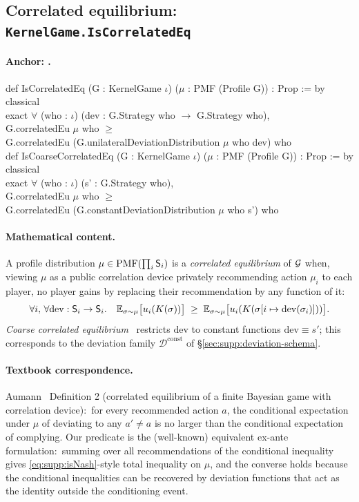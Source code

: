 \documentclass[11pt]{article}
\renewcommand{\TT}[1]{\texttt{\detokenize{#1}}}
\newcommand{\Anchor}[1]{\paragraph{Anchor: \texorpdfstring{\TT{#1}}{#1}.}}
\newcommand{\Mathematical}{\paragraph{Mathematical content.}}
\newcommand{\Textbook}{\paragraph{Textbook correspondence.}}
\begin{document}
\subsection{Correlated equilibrium: \texttt{KernelGame.IsCorrelatedEq}}
\label{sec:supp:isCE}\label{def:KernelGame.IsCorrelatedEq}

\Anchor{KernelGame.IsCorrelatedEq}
\begin{leanbox}
def IsCorrelatedEq (G : KernelGame $\iota$) ($\mu$ : PMF (Profile G)) : Prop := by\\
\bd classical\\
\bd exact $\forall$ (who : $\iota$) (dev : G.Strategy who $\to$ G.Strategy who),\\
\bdd G.correlatedEu $\mu$ who $\ge$\\
\bdd G.correlatedEu (G.unilateralDeviationDistribution $\mu$ who dev) who\\[3pt]
def IsCoarseCorrelatedEq (G : KernelGame $\iota$) ($\mu$ : PMF (Profile G)) : Prop := by\\
\bd classical\\
\bd exact $\forall$ (who : $\iota$) (s' : G.Strategy who),\\
\bdd G.correlatedEu $\mu$ who $\ge$\\
\bdd G.correlatedEu (G.constantDeviationDistribution $\mu$ who s') who
\end{leanbox}

\Mathematical
A profile distribution $\mu \in \mathrm{PMF}(\prod_i \mathsf{S}_i)$ is a
\emph{correlated equilibrium} of $\mathcal{G}$ when, viewing $\mu$ as a
public correlation device privately recommending action $\mu_i$ to
each player, no player gains by replacing their recommendation by
any function of it:
\[
  \forall i,\,\forall \mathrm{dev} : \mathsf{S}_i \to \mathsf{S}_i.\quad
    \mathbb{E}_{\sigma \sim \mu}\bigl[u_i(K(\sigma))\bigr]
    \;\ge\;
    \mathbb{E}_{\sigma \sim \mu}\bigl[u_i(K(\sigma[i \mapsto \mathrm{dev}(\sigma_i)]))\bigr].
\]
\emph{Coarse correlated equilibrium}~\citep{HartMasColell2000}
restricts $\mathrm{dev}$ to constant functions $\mathrm{dev} \equiv s'$;
this corresponds to the deviation family
$\mathcal{D}^{\mathrm{const}}$ of
\S\ref{sec:supp:deviation-schema}.

\Textbook
Aumann~\citep{Aumann1974} Definition 2 (correlated equilibrium of
a finite Bayesian game with correlation device):\ for every
recommended action $a$, the conditional expectation under $\mu$ of
deviating to any $a' \neq a$ is no larger than the conditional
expectation of complying.  Our predicate is the (well-known)
equivalent ex-ante formulation:\ summing over all recommendations
of the conditional inequality gives \eqref{eq:supp:isNash}-style
total inequality on $\mu$, and the converse holds because the
conditional inequalities can be recovered by deviation functions
that act as the identity outside the conditioning event.
\end{document}
